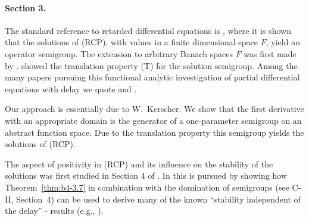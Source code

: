\paragraph{Section 3.} The standard reference to retarded differential equations is \citet{hale:1977}, where it is shown that the solutions of (RCP), with values in a finite dimensional space $F$, yield an operator semigroup. 
The extension to arbitrary Banach spaces $F$ was first made by \citet{traviswebb:1974}. 
\citet{plant:1977} showed the translation property (T) for the solution semigroup. 
Among the many papers pursuing this functional analytic investigation of partial differential equations with delay we quote \citet{diblasioetal:1984} and \citet{kunischschappacher:1983}.

Our approach is essentially due to W.~Kerscher. 
We show that the first derivative with an appropriate domain is the generator of a one-parameter semigroup on an abstract function space. 
Due to the translation property this semigroup yields the solutions of (RCP).

The aspect of positivity in (RCP) and its influence on the stability of the solutions was first studied in Section 4 of \citet{kerschernagel:1984}. 
In \citet{kerscher:1986} this is pursued by showing how Theorem~\ref{thm:b4-3.7} in combination with the domination of semigroups (see C-II, Section~4) can be used to derive many of the known \enquote{stability independent of the delay} - results (e.g., \citet{cookeferreira:1983}).







